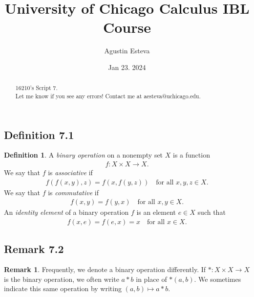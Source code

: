 \documentclass[openany, amssymb, psamsfonts]{amsart}
\title{University of Chicago Calculus IBL Course}
\author{Agustin Esteva}
\date{Jan 23. 2024}
\newcommand{\arr}{\longrightarrow}
\theoremstyle{definition}
\newtheorem{defn}{Definition}[section]
\newtheorem{rem}{Remark}[section]
\numberwithin{equation}{section}
\begin{document}
\begin{abstract}

16210's Script 7.\\ Let me know if you see any errors! Contact me at aesteva@uchicago.edu.


\end{abstract}

\maketitle

\tableofcontents
\setcounter{section}{7}



\subsection*{Definition 7.1}
\begin{defn}
\label{7.1}
A \emph{binary operation} on a nonempty set $X$ is a function 
	\begin{align*}
		f \colon X \times X \arr X.
	\end{align*}
	We say that $f$ is \emph{associative} if
	\begin{align*}
		f(f(x, y), z) = f(x, f(y, z)) \quad \text{for all $x, y, z \in X$.}
	\end{align*}
	We say that $f$ is \emph{commutative} if
	\begin{align*}
		f(x, y) = f(y, x) \quad \text{for all $x, y \in X$.}
	\end{align*}
	An \emph{identity element} of a binary operation $f$ is an element $e \in X$ such that
	\begin{align*}
		f(x, e) = f(e, x) = x \quad \text{for all $x \in X$.}
	\end{align*}
\end{defn}
\subsection*{Remark 7.2}
\begin{rem}
\label{7.2}
Frequently, we denote a binary operation differently. If $*\colon X\times X\arr X$ is the binary operation, we often write $a*b$ in place of $*(a,b)$. We sometimes indicate this same operation by writing $(a,b)\mapsto a*b$.
\end{rem}
\end{document}

